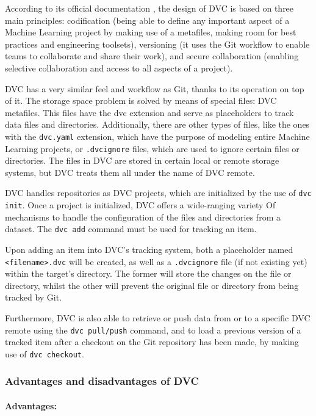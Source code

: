 According to its official documentation \cite{dvcdocs}, the design of DVC is based on three main principles: codification (being able to define any important aspect
of a Machine Learning project by making use of a metafiles, making room for best practices and engineering toolsets), versioning (it uses the Git workflow to enable 
teams to collaborate and share their work), and secure collaboration (enabling selective collaboration and access to all aspects of a project).

DVC has a very similar feel and workflow as Git, thanks to its operation on top of it. The storage space problem is solved by means of special files: DVC metafiles. 
This files have the dvc extension and serve as placeholders to track data files and directories. Additionally, there are other types of files, like the ones with the 
\texttt{dvc.yaml} extension, which have the purpose of modeling entire Machine Learning projects, or \texttt{.dvcignore} files, which are used to ignore certain files or 
directories. The files in DVC are stored in certain local or remote storage systems, but DVC treats them all under the name of DVC remote.

DVC handles repositories as DVC projects, which are initialized by the use of \texttt{dvc init}. Once a project is initialized, DVC offers a wide-ranging variety Of
mechanisms to handle the configuration of the files and directories from a dataset. The \texttt{dvc add} command must be used for tracking an item.

Upon adding an item into DVC's tracking system, both a placeholder named \texttt{<filename>.dvc} will be created, as well as a \texttt{.dvcignore} file (if not
existing yet) within the target's directory. The former will store the changes on the file or directory, whilst the other will prevent the original file or directory from
being tracked by Git.

Furthermore, DVC is also able to retrieve or push data from or to a specific DVC remote using the \texttt{dvc pull/push} command, and to load a previous version of a tracked 
item after a checkout on the Git repository has been made, by making use of \texttt{dvc checkout}.

\subsubsection{Advantages and disadvantages of DVC}

\paragraph{Advantages:\cite{dvcoverview}}

